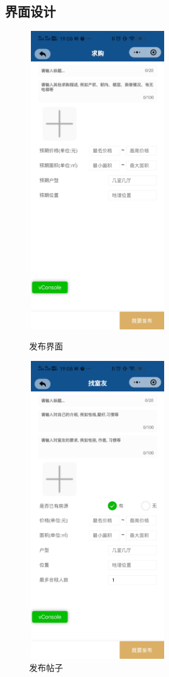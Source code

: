 \subsection{界面设计}
\begin{figure}[htbp]
    \centering
    \begin{minipage}[t]{0.48\textwidth}
    \centering
    \includegraphics[width=6cm,height=13cm]{design/image/fabu4.png} 
    \caption{发布界面}
    \end{minipage}
    \begin{minipage}[t]{0.48\textwidth}
    \centering
    \includegraphics[width=6cm,height=13cm]{design/image/fabu5.png}
    \caption{发布帖子}
    \end{minipage}
    \end{figure}


